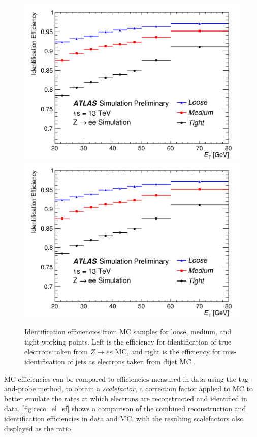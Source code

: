\begin{centering}
\begin{figure}[!hbt]
\myfloatalign
\includegraphics[width=.48\linewidth]{figures/reco/fig_01a.png}
\includegraphics[width=.48\linewidth]{figures/reco/fig_01a.png}
\caption{ Identification efficiencies from \ac{MC} samples for loose, medium, and tight working points. Left is the efficiency for identification of true electrons taken from $Z\rightarrow ee$ \ac{MC}, and right is the efficiency for mis-identification of jets as electrons taken from dijet \ac{MC} \cite{ATLAS-CONF-2016-024}.}
\label{fig:reco_el_eff}
\end{figure}
\end{centering}

\ac{MC} efficiencies can be compared to efficiencies measured in data using the tag-and-probe method, to obtain a \textit{scalefactor}, a correction factor applied to \ac{MC} to better emulate the rates at which electrons are reconstructed and identified in data. \autoref{fig:reco_el_sf} shows a comparison of the combined reconstruction and identification efficiencies in data and \ac{MC}, with the resulting scalefactors also displayed as the ratio. 

